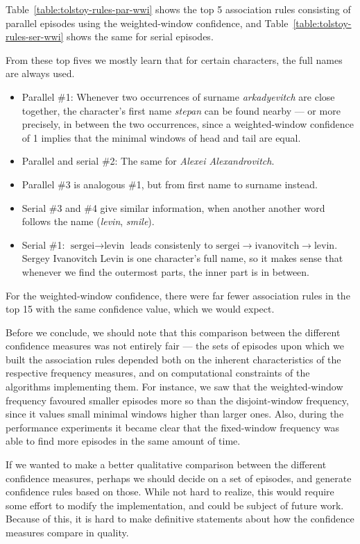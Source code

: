 Table~\ref{table:tolstoy-rules-par-wwi} shows the top 5 association rules consisting of parallel episodes using the weighted-window confidence, and Table~\ref{table:tolstoy-rules-ser-wwi} shows the same for serial episodes.

From these top fives we mostly learn that for certain characters, the full names are always used.

\begin{itemize}
\item Parallel \#1: Whenever two occurrences of surname \emph{arkadyevitch} are close together, the character's first name \emph{stepan} can be found nearby --- or more precisely, in between the two occurrences, since a weighted-window confidence of 1 implies that the minimal windows of head and tail are equal.
\item Parallel and serial \#2: The same for \emph{Alexei Alexandrovitch}.
\item Parallel \#3 is analogous \#1, but from first name to surname instead.
\item Serial \#3 and \#4 give similar information, when another another word follows the name (\emph{levin}, \emph{smile}).
\item Serial \#1: $ \text{sergei} \to \text{levin} $ leads consistenly to $ \text{sergei} \to \text{ivanovitch} \to \text{levin} $. Sergey Ivanovitch Levin is one character's full name, so it makes sense that whenever we find the outermost parts, the inner part is in between.
\end{itemize}

For the weighted-window confidence, there were far fewer association rules in the top 15 with the same confidence value, which we would expect.

Before we conclude, we should note that this comparison between the different confidence measures was not entirely fair --- the sets of episodes upon which we built the association rules depended both on the inherent characteristics of the respective frequency measures, and on computational constraints of the algorithms implementing them. For instance, we saw that the weighted-window frequency favoured smaller episodes more so than the disjoint-window frequency, since it values small minimal windows higher than larger ones. Also, during the performance experiments it became clear that the fixed-window frequency was able to find more episodes in the same amount of time.

If we wanted to make a better qualitative comparison between the different confidence measures, perhaps we should decide on a set of episodes, and generate confidence rules based on those. While not hard to realize, this would require some effort to modify the implementation, and could be subject of future work. Because of this, it is hard to make definitive statements about how the confidence measures compare in quality.

